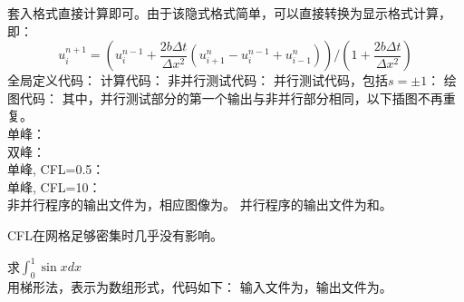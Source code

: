 \documentclass{ctexart}
\begin{document}
\begin{answer}
    套入格式直接计算即可。由于该隐式格式简单，可以直接转换为显示格式计算，即：
    \[u_i^{n+1}=(u_i^{n-1}+\frac{2b\Delta t}{\Delta x^2}(u_{i+1}^n-u_i^{n-1}+u_{i-1}^n))/(1+\frac{2b\Delta t}{\Delta x^2})\]
    全局定义代码：
    计算代码：
    非并行测试代码：
    并行测试代码，包括$s=\pm 1$：
    绘图代码：
    其中，并行测试部分的第一个输出与非并行部分相同，以下插图不再重复。\\
    单峰：
    \\
    双峰：
    \\
    单峰, CFL=0.5：
    \\
    单峰, CFL=10：
    \\
    非并行程序的输出文件为，相应图像为。
    并行程序的输出文件为和。

    CFL在网格足够密集时几乎没有影响。

    求$\int_0^1 \sin x dx$\\

    用梯形法，表示为数组形式，代码如下：
    输入文件为，输出文件为。

\end{answer}
\end{document}
